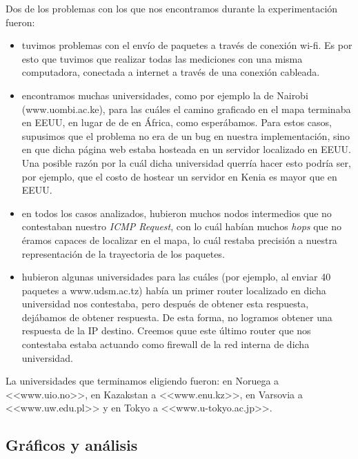 \documentclass[final,inline,a4paper,narroweqnarray]{ieee}
\let\Oldsubsection\subsection
\renewcommand{\subsection}{\FloatBarrier\Oldsubsection}
\begin{document}
Dos de los problemas con los que nos encontramos durante la experimentación fueron:
\begin{itemize}
	\item tuvimos problemas con el envío de paquetes a través de conexión wi-fi. Es por 
	esto que tuvimos que realizar todas las mediciones con una misma computadora, 
	conectada a internet a través de una conexión cableada.
	\item encontramos muchas universidades, como por ejemplo la de Nairobi (www.uombi.ac.ke), 
	para las cuáles el camino graficado en el mapa terminaba en EEUU, en lugar de de en África, 
	como esperábamos. Para estos
	casos, supusimos que el problema no era de un bug en nuestra implementación, sino en que
	dicha página web estaba hosteada
	en un servidor localizado en EEUU. Una posible razón por la cuál dicha universidad 
	querría hacer esto podría ser, por 
	ejemplo, que el costo de hostear un servidor en Kenia es mayor que en EEUU.
	\item en todos los casos analizados, hubieron muchos nodos intermedios que no 
	contestaban nuestro \emph{ICMP Request}, con
	lo cuál habían muchos \emph{hops} que no éramos capaces de localizar en el mapa, 
	lo cuál restaba precisión a nuestra 
	representación de la trayectoria de los paquetes.
	\item hubieron algunas universidades para las cuáles (por ejemplo, al enviar
	40 paquetes a www.udsm.ac.tz) había un primer router localizado en dicha universidad  
	nos contestaba, pero
	después de obtener esta respuesta, dejábamos de obtener respuesta. De esta forma, no 
	logramos obtener una respuesta de la IP destino. Creemos quue este 
	último router que nos contestaba estaba actuando como firewall de la red interna
	de dicha universidad.
\end{itemize}

La universidades que terminamos eligiendo fueron: en Noruega a <<www.uio.no>>, en Kazakstan a
 <<www.enu.kz>>, en Varsovia a <<www.uw.edu.pl>> y en Tokyo a <<www.u-tokyo.ac.jp>>.

\subsection{Gráficos y análisis}

\end{document}
